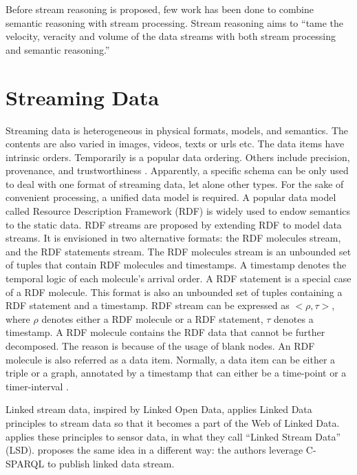 Before stream reasoning \cite{della2009s} is proposed, few work has been done to combine semantic reasoning with stream processing. 
Stream reasoning aims to ``tame the velocity, veracity and volume of the data streams with both stream processing and semantic reasoning.'' \cite{edellavalle2018itsa}
%
\section{Streaming Data}
Streaming data is heterogeneous in physical formats, models, and semantics.
The contents are also varied in images, videos, texts or urls etc.
The data items have intrinsic orders.
Temporarily is a popular data ordering. 
Others include precision, provenance, and trustworthiness \cite{della2013order}.
Apparently, a specific schema can be only used to deal with one format of streaming data, let alone other types. 
For the sake of convenient processing, a unified data model is required.
A popular data model called Resource Description Framework (RDF) is widely used to endow semantics to the static data.
RDF streams \cite{della2009first} are proposed by extending RDF to model data streams. 
It is envisioned in two alternative formats: the RDF molecules stream, and the RDF statements stream.
The RDF molecules stream is an unbounded set of tuples that contain RDF molecules \cite{ding2005tracking} and timestamps.
A timestamp denotes the temporal logic of each molecule's arrival order.
A RDF statement is a special case of a RDF molecule.
This format is also an unbounded set of tuples containing a RDF statement and a timestamp. 
RDF stream can be expressed as $<\rho , \tau>$, where $\rho$ denotes either a RDF molecule or a RDF statement, $\tau$ denotes a timestamp.
A RDF molecule contains the RDF data that cannot be further decomposed. 
The reason is because of the usage of blank nodes.
An RDF molecule is also referred as a data item. 
Normally, a data item can be either a triple or a graph, annotated by a timestamp that can either be a time-point or a timer-interval \cite{srtutorial}. 

Linked stream data, inspired by Linked Open Data, applies Linked Data principles \cite{bizer2008linked} to stream data so that it becomes a part of the Web of Linked Data.
\cite{sequeda2009linked} applies these principles to sensor data, in what they call ``Linked Stream Data'' (LSD). 
\cite{barbieri2010proposal} proposes the same idea in a different way: 
the authors leverage C-SPARQL \cite{barbieri2009c} to publish linked data stream.

